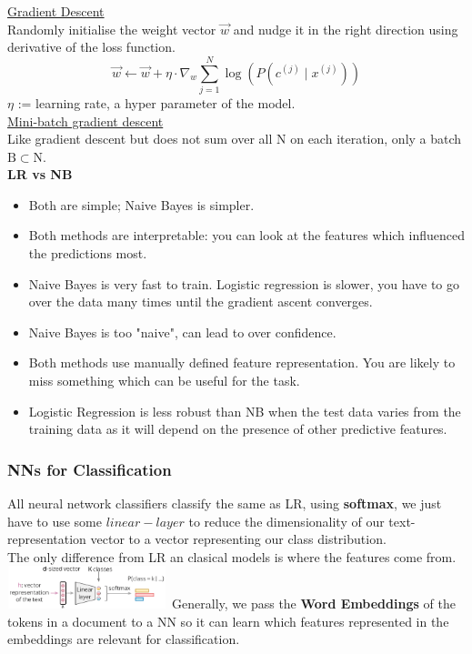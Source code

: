 \documentclass[8pt]{extarticle} %
\begin{document}
\begin{multicols*}{3}
\underline{Gradient Descent}\\

Randomly initialise the weight vector $\vec{w}$ and nudge it in the right direction using derivative of the loss function.
$$
\vec{w} \leftarrow \vec{w}+\eta \cdot \nabla_w \sum_{j=1}^N \log \left(P\left(c^{(j)} \mid x^{(j)}\right)\right)
$$
$\eta$ := learning rate, a hyper parameter of the model. \\

\underline{Mini-batch gradient descent}\\

Like gradient descent but does not sum over all $\mathrm{N}$ on each iteration, only a batch $\mathrm{B}\subset\mathrm{N}$.\\

\textbf{LR vs NB}
\begin{itemize}[label=\textbullet, labelsep=0.3em, leftmargin=0.5em, itemsep=0em]
    \item Both are simple; Naive Bayes is simpler.
    \item Both methods are interpretable: you can look at the features which influenced the predictions most.
    \item Naive Bayes is very fast to train. Logistic regression is slower, you have to go over the data many times until the gradient ascent converges.
    \item Naive Bayes is too "naive", can lead to over confidence. 
    \item Both methods use manually defined feature representation. You are likely to miss something which can be useful for the task.
    \item Logistic Regression is less robust than NB when the test data varies from the training data as it will depend on the presence of other predictive features.
\end{itemize}

\subsubsection*{NNs for Classification}
All neural network classifiers classify the same as LR, using \textbf{softmax}, we just have to use some $linear-layer$ to reduce the dimensionality of our text-representation vector to a vector representing our class distribution. \\
The only difference from LR an clasical models is where the features come from. \\
\includegraphics[width=0.35\textwidth]{media/nn-classifier.png}
Generally, we pass the \textbf{Word Embeddings} of the tokens in a document to a NN so it can learn which features represented in the embeddings are relevant for classification. \\


\end{multicols*}
\end{document}
